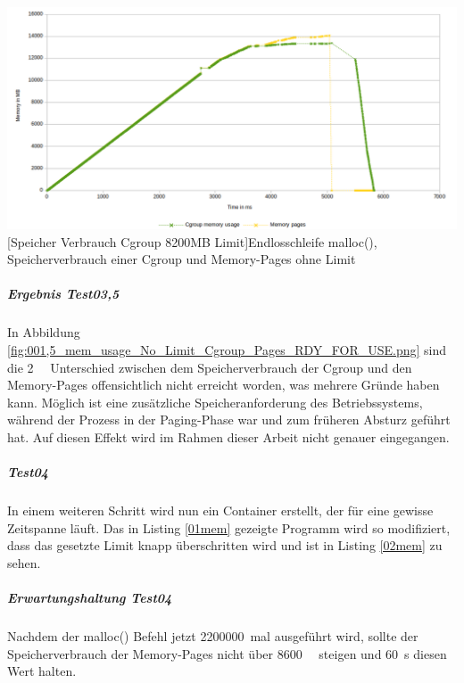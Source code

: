 \vspace{1em}
\begin{minipage}{\linewidth}
	\centering
	\includegraphics[width=1\linewidth]{pics/001,5_mem_usage_No_Limit_Cgroup_Pages_RDY_FOR_USE.png}
	[Speicher Verbrauch Cgroup 8200MB Limit]{Endlosschleife malloc(), Speicherverbrauch einer Cgroup und Memory-Pages ohne Limit}
	\label{fig:001,5_mem_usage_No_Limit_Cgroup_Pages_RDY_FOR_USE.png}
\end{minipage}

\subparagraph{Ergebnis Test03,5}
In Abbildung \ref{fig:001,5_mem_usage_No_Limit_Cgroup_Pages_RDY_FOR_USE.png} sind die \SI{2}{\giga\byte} Unterschied zwischen dem Speicherverbrauch der Cgroup und den Memory-Pages offensichtlich nicht erreicht worden, was mehrere Gründe haben kann. Möglich ist eine zusätzliche Speicheranforderung des Betriebssystems, während der Prozess in der Paging-Phase war und zum früheren Absturz geführt hat. Auf diesen Effekt wird im Rahmen dieser Arbeit nicht genauer eingegangen.



\subparagraph{Test04}
In einem weiteren Schritt wird nun ein Container erstellt, der für eine gewisse Zeitspanne läuft. Das in Listing \ref{01mem} gezeigte Programm wird so modifiziert, dass das gesetzte Limit knapp überschritten wird und ist in Listing \ref{02mem} zu sehen. 

\vspace{1em}


\subparagraph{Erwartungshaltung Test04}
Nachdem der malloc() Befehl jetzt \SI{2200000}{mal} ausgeführt wird, sollte der Speicherverbrauch der Memory-Pages nicht über \SI{8600}{\mega\byte} steigen und \SI{60}{\second} diesen Wert halten.



